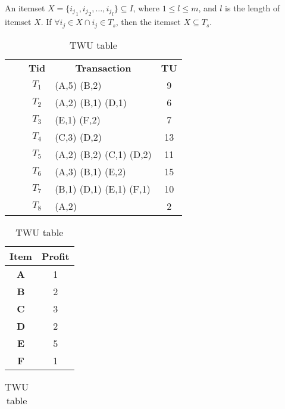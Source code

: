 \documentclass[runningheads,a4paper]{llncs}
\begin{document}
An itemset $ X = \{{i_{j}}_{1},{i_{j}}_{2},\ldots,{i_{j}}_{l}\} \subseteq I $, where $ 1{\leqslant}l{\leqslant}m $, and $ l $ is the length of itemset $ X $. If $ \forall i_{j} \in X \cap i_{j} \in T_{s}$, then the itemset $ X \subseteq T_{s} $.

\begin{table}
\begin{minipage}[t]{.45\linewidth}
\centering
\caption{transaction database }
\begin{tabular}{ cc|c|l|c |} 
\cline{3-5} & & \textbf{Tid} & \multicolumn{1}{c|}{\textbf{Transaction}} & \textbf{TU} \\ 
\cline{3-5} 
\cline{3-5} {\multirow{5}{*}{\rotatebox{90}{ $ D0 $}}}& {\multirow{5}{*}{ }} & $ T_{1} $ & (A,5) (B,2) & 9\\ 
\cline{3-5}& & $ T_{2} $ & (A,2) (B,1) (D,1) & 6 \\
\cline{3-5}& & $ T_{3} $ & (E,1) (F,2) & 7 \\
\cline{3-5}& & $ T_{4} $ & (C,3) (D,2) & 13 \\
\cline{3-5}& & $ T_{5} $ & (A,2) (B,2) (C,1) (D,2) & 11 \\
\cline{2-5} {\multirow{3}{*}{\rotatebox{90}{ $ D1 $ }}}& & $ T_{6} $ & (A,3) (B,1) (E,2) & 15\\
\cline{3-5} & & $ T_{7} $ & (B,1) (D,1) (E,1) (F,1) & 10 \\
\cline{3-5} & & $ T_{8} $ & (A,2)  & 2 \\ 
\cline{3-5}
\end{tabular}
\label{table:1}
\end{minipage}
\begin{minipage}[t]{.25\linewidth}
\centering
\caption{Profit table}
\begin{tabular}{|c|c|} \hline
\textbf{Item} & \textbf{Profit} \\ \hline
\textbf{A} & 1 \\ \hline
\textbf{B} & 2 \\ \hline
\textbf{C} & 3\\ \hline
\textbf{D} & 2\\ \hline
\textbf{E} & 5\\ \hline
\textbf{F} & 1\\ \hline
\end{tabular}
\label{table:2}
\end{minipage}
\begin{minipage}[t]{.25\linewidth}
\centering
\caption{TWU table}
\begin{tabular}{|c|c|c|} \hline



\end{tabular}
\end{minipage}
\end{table}
\end{document}
